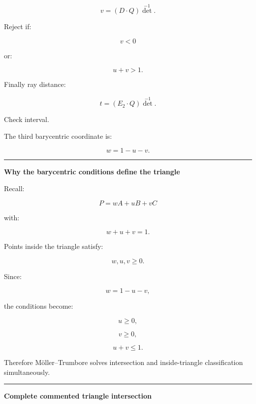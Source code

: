 \[
\boxed{
v=
(D\cdot Q)\det^{-1}.
}
\]

Reject if:

\[
v<0
\]

or:

\[
u+v>1.
\]

Finally ray distance:

\[
\boxed{
t=
(E_2\cdot Q)\det^{-1}.
}
\]

Check interval.

The third barycentric coordinate is:

\[
\boxed{
w=1-u-v.
}
\]

\begin{center}\rule{0.5\linewidth}{0.5pt}\end{center}

\textbf{Why the barycentric conditions define the triangle}

Recall:

\[
P=
wA+uB+vC
\]

with:

\[
w+u+v=1.
\]

Points inside the triangle satisfy:

\[
w,u,v\ge0.
\]

Since:

\[
w=1-u-v,
\]

the conditions become:

\[
u\ge0,
\]

\[
v\ge0,
\]

\[
u+v\le1.
\]

Therefore Möller--Trumbore solves intersection and inside-triangle classification simultaneously.

\begin{center}\rule{0.5\linewidth}{0.5pt}\end{center}

\textbf{Complete commented triangle intersection}


